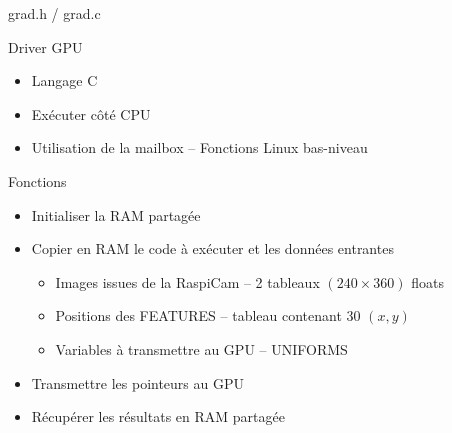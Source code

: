 \documentclass{bredelebeamer}
\begin{document}
\begin{frame}{grad.h / grad.c}

\begin{block}{Driver GPU}
\begin{itemize}
\item Langage C
\item Exécuter c\^oté CPU
\item Utilisation de la mailbox -- Fonctions Linux bas-niveau
\end{itemize}
\end{block}

\begin{block}{Fonctions}
\begin{itemize}
\item Initialiser la RAM partagée
\item Copier en RAM le code à exécuter et les données entrantes
	\begin{itemize}
		\item Images issues de la RaspiCam -- 2 tableaux $(240\times 360)$ floats
		\item Positions des FEATURES -- tableau contenant 30 $(x,y)$
		\item Variables à transmettre au GPU -- UNIFORMS
	\end{itemize}
\item Transmettre les pointeurs au GPU
\item Récupérer les résultats en RAM partagée
\end{itemize}
\end{block}

\end{frame}

\end{document}
